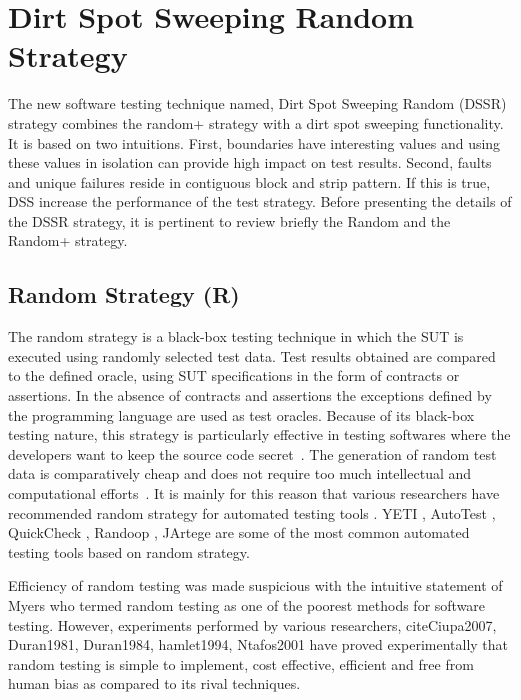 
\section{Dirt Spot Sweeping Random Strategy}\label{sec:dssr}
The new software testing technique named, Dirt Spot Sweeping Random (DSSR) strategy combines the random+ strategy with a dirt spot sweeping functionality. It is based on two intuitions. First, boundaries have interesting values and using these values in isolation can provide high impact on test results. Second, faults and unique failures reside in contiguous block and strip pattern. If this is true, DSS increase the performance of the test strategy. Before presenting the details of the DSSR strategy, it is pertinent to review briefly the Random and the Random+ strategy.

\subsection{Random Strategy (R)}
The random strategy is a black-box testing technique in which the SUT is executed using randomly selected test data. Test results obtained are compared to the defined oracle, using SUT specifications in the form of contracts or assertions. In the absence of contracts and assertions the exceptions defined by the programming language are used as test oracles. Because of its black-box testing nature, this strategy is particularly effective in testing softwares where the developers want to keep the source code secret~\cite{Chen2010}. The generation of random test data is comparatively cheap and does not require too much intellectual and computational efforts~\cite{Ciupa2009, Ciupa2008}. It is mainly for this reason that various researchers have recommended random strategy for automated testing tools \cite{Ciupa2008a}. YETI \cite{Oriol2010a, Oriol2010}, AutoTest \cite{Leitner2007, Ciupa2007}, QuickCheck \cite{Claessen2000}, Randoop \cite{Pacheco2007}, JArtege \cite{Oriat2004} are some of the most common automated testing tools based on random strategy.

\indent Efficiency of random testing was made suspicious with the intuitive statement of Myers \cite{Myers2004} who termed random testing as one of the poorest methods for software testing. However, experiments performed by various researchers, cite{Ciupa2007, Duran1981, Duran1984, hamlet1994, Ntafos2001} have proved experimentally that random testing is simple to implement, cost effective, efficient and free from human bias as compared to its rival techniques.

